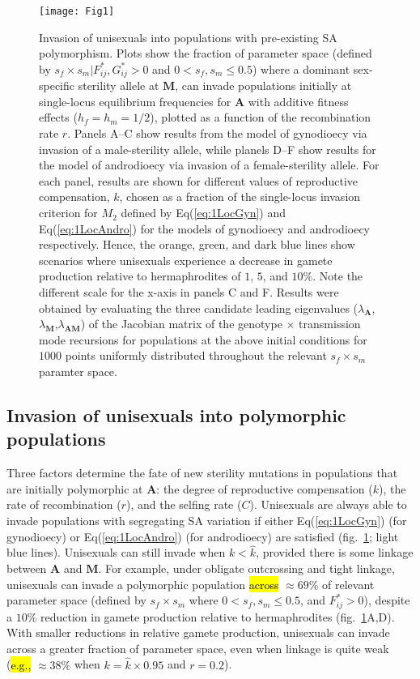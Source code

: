 \documentclass[9pt,twocolumn,twoside,lineno]{gsajnl}
\begin{document}
\begin{figure}[htbp]
\centering
\texttt{[image: Fig1]}
\caption{Invasion of unisexuals into populations with pre-existing SA polymorphism. Plots show the fraction of parameter space (defined by $s_f \times s_m | F^{\ast}_{ij},G^{\ast}_{ij} > 0$ and $0 < s_f,s_m \leq 0.5$) where a dominant sex-specific sterility allele at $\mathbf{M}$, can invade populations initially at single-locus equilibrium frequencies for $\mathbf{A}$ with additive fitness effects ($h_f=h_m=1/2$), plotted as a function of the recombination rate $r$. Panels A--C show results from the model of gynodioecy via invasion of a male-sterility allele, while planels D--F show results for the model of androdioecy via invasion of a female-sterility allele. For each panel, results are shown for different values of reproductive compensation, $k$, chosen as a fraction of the single-locus invasion criterion for $M_2$ defined by Eq(\ref{eq:1LocGyn}) and Eq(\ref{eq:1LocAndro}) for the models of gynodioecy and androdioecy respectively. Hence, the orange, green, and dark blue lines show scenarios where unisexuals experience a decrease in gamete production relative to hermaphrodites of $1$, $5$, and $10\%$. Note the different scale for the x-axis in panels C and F. Results were obtained by evaluating the three candidate leading eigenvalues ($\lambda_{\mathbf{A}}$,$\lambda_{\mathbf{M}}$,$\lambda_{\mathbf{AM}}$) of the Jacobian matrix of the genotype $\times$ transmission mode recursions for populations at the above initial conditions for $1000$ points uniformly distributed throughout the relevant $s_f \times s_m$ paramter space.}
\label{fig:PrInv}
\end{figure}

\subsection{Invasion of unisexuals into polymorphic populations}

Three factors determine the fate of new sterility mutations in populations that are initially polymorphic at $\mathbf{A}$: the degree of reproductive compensation ($k$), the rate of recombination ($r$), and the selfing rate ($C$). Unisexuals are always able to invade populations with segregating SA variation if either Eq(\ref{eq:1LocGyn}) (for gynodioecy) or Eq(\ref{eq:1LocAndro}) (for androdioecy) are satisfied (fig.~\ref{fig:PrInv}; light blue lines). Unisexuals can still invade when $k < \hat{k}$, provided there is some linkage between $\mathbf{A}$ and $\mathbf{M}$. For example, under obligate outcrossing and tight linkage, unisexuals can invade a polymorphic population \hl{across} $\approx 69\%$ of relevant parameter space (defined by $s_f \times s_m$ where $0 < s_f,s_m \leq 0.5$, and $F^{\ast}_{ij} > 0$), despite a $10\%$ reduction in gamete production relative to hermaphrodites (fig.~\ref{fig:PrInv}A,D). With smaller reductions in relative gamete production, unisexuals can invade across a greater fraction of parameter space, even when linkage is quite weak (\hl{e.g.,} $\approx 38\%$ when $k = \hat{k} \times 0.95 $ and $r = 0.2$). 
\end{document}
